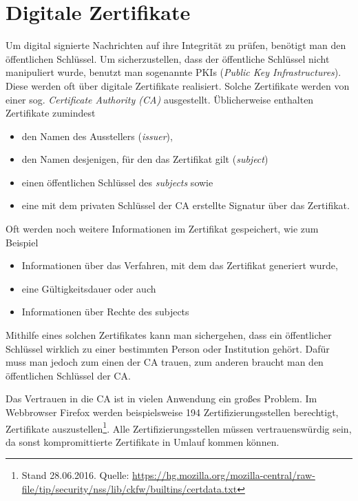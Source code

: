 \section{Digitale Zertifikate}
\indexDigitalCert Um digital signierte Nachrichten auf ihre Integrität
zu prüfen, benötigt man den öffentlichen Schlüssel. Um sicherzustellen,
dass der öffentliche Schlüssel nicht manipuliert wurde, benutzt man
sogenannte PKIs (\emph{Public Key Infrastructures}). Diese werden oft
über digitale Zertifikate realisiert. Solche Zertifikate werden von
einer sog. \emph{Certificate Authority (CA)}\indexCertAuthority
ausgestellt. Üblicherweise enthalten Zertifikate zumindest
\begin{itemize}
\item den Namen des Ausstellers (\emph{issuer}),
\item den Namen desjenigen, für den das Zertifikat gilt (\emph{subject})
\item einen öffentlichen Schlüssel des \emph{subjects} sowie
\item eine mit dem privaten Schlüssel der CA erstellte Signatur über
  das Zertifikat.
\end{itemize} Oft werden noch weitere Informationen im Zertifikat
gespeichert, wie zum Beispiel
\begin{itemize}
\item Informationen über das Verfahren, mit dem das Zertifikat generiert
  wurde,
\item eine Gültigkeitsdauer oder auch
\item Informationen über Rechte des subjects
\end{itemize}

Mithilfe eines solchen Zertifikates kann man sichergehen, dass ein
öffentlicher Schlüssel wirklich zu einer bestimmten Person oder
Institution gehört. Dafür muss man jedoch zum einen der CA
\indexCertAuthority trauen, zum anderen braucht man den öffentlichen
Schlüssel der CA.

Das Vertrauen in die CA ist in vielen Anwendung ein großes Problem. Im
Webbrowser Firefox werden beispielsweise 194 Zertifizierungsstellen
berechtigt, Zertifikate auszustellen\footnote{Stand 28.06.2016. Quelle:
  \url{https://hg.mozilla.org/mozilla-central/raw-file/tip/security/nss/lib/ckfw/builtins/certdata.txt}}. Alle
Zertifizierungsstellen müssen vertrauenswürdig sein, da sonst
kompromittierte Zertifikate in Umlauf kommen können.

